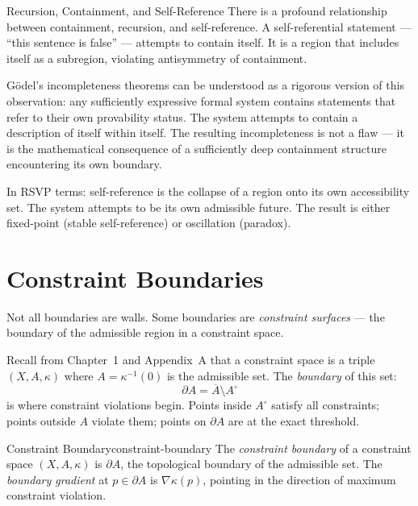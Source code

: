 \begin{conceptaside}{Recursion, Containment, and Self-Reference}
  There is a profound relationship between containment, recursion, and
  self-reference. A self-referential statement — ``this sentence is false''
  — attempts to contain itself. It is a region that includes itself as
  a subregion, violating antisymmetry of containment.

  Gödel's incompleteness theorems can be understood as a rigorous version
  of this observation: any sufficiently expressive formal system contains
  statements that refer to their own provability status. The system attempts
  to contain a description of itself within itself. The resulting
  incompleteness is not a flaw — it is the mathematical consequence of
  a sufficiently deep containment structure encountering its own boundary.

  In RSVP terms: self-reference is the collapse of a region onto its own
  accessibility set. The system attempts to be its own admissible future.
  The result is either fixed-point (stable self-reference) or oscillation
  (paradox).
\end{conceptaside}

\section{Constraint Boundaries}

Not all boundaries are walls. Some boundaries are \emph{constraint surfaces}
— the boundary of the admissible region in a constraint space.

Recall from Chapter~1 and Appendix~A that a constraint space is a triple
$(X, A, \kappa)$ where $A = \kappa^{-1}(0)$ is the admissible set. The
\emph{boundary} of this set:
\[
  \partial A = \overline{A} \setminus A^\circ
\]
is where constraint violations begin. Points inside $A^\circ$ satisfy all
constraints; points outside $A$ violate them; points on $\partial A$ are
at the exact threshold.

\begin{definition}{Constraint Boundary}{constraint-boundary}
  The \emph{constraint boundary} of a constraint space $(X, A, \kappa)$
  is $\partial A$, the topological boundary of the admissible set.
  The \emph{boundary gradient} at $p \in \partial A$ is $\nabla \kappa(p)$,
  pointing in the direction of maximum constraint violation.
\end{definition}

